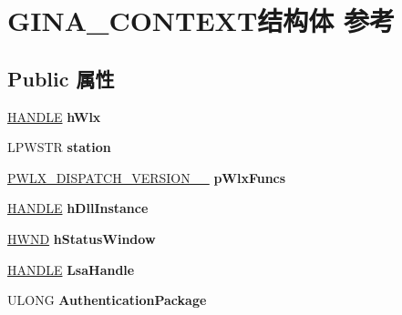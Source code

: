 \hypertarget{struct_g_i_n_a___c_o_n_t_e_x_t}{}\section{G\+I\+N\+A\+\_\+\+C\+O\+N\+T\+E\+X\+T结构体 参考}
\label{struct_g_i_n_a___c_o_n_t_e_x_t}
\subsection*{Public 属性}
\begin{DoxyCompactItemize}
\item 
\mbox{\label{struct_g_i_n_a___c_o_n_t_e_x_t_a8d3cb503eddfdc4de68cf738bfe8f876}} 
\hyperlink{interfacevoid}{H\+A\+N\+D\+LE} {\bfseries h\+Wlx}
\item 
\mbox{\label{struct_g_i_n_a___c_o_n_t_e_x_t_a18ffd634dbb32a40c13ec0a2cfe172a3}} 
L\+P\+W\+S\+TR {\bfseries station}
\item 
\mbox{\label{struct_g_i_n_a___c_o_n_t_e_x_t_ab94830523b274d730bfc6ade6144b2fe}} 
\hyperlink{struct___w_l_x___d_i_s_p_a_t_c_h___v_e_r_s_i_o_n__1__3}{P\+W\+L\+X\+\_\+\+D\+I\+S\+P\+A\+T\+C\+H\+\_\+\+V\+E\+R\+S\+I\+O\+N\+\_\+\_} {\bfseries p\+Wlx\+Funcs}
\item 
\mbox{\label{struct_g_i_n_a___c_o_n_t_e_x_t_a9a980fb43768f7759dcb4eaa1e26899a}} 
\hyperlink{interfacevoid}{H\+A\+N\+D\+LE} {\bfseries h\+Dll\+Instance}
\item 
\mbox{\label{struct_g_i_n_a___c_o_n_t_e_x_t_a75a34c7be58e9372b09af8b4dbe49360}} 
\hyperlink{interfacevoid}{H\+W\+ND} {\bfseries h\+Status\+Window}
\item 
\mbox{\label{struct_g_i_n_a___c_o_n_t_e_x_t_a0d8c54571b10bef142e3496ea21d2073}} 
\hyperlink{interfacevoid}{H\+A\+N\+D\+LE} {\bfseries Lsa\+Handle}
\item 
\mbox{\label{struct_g_i_n_a___c_o_n_t_e_x_t_a861816d7f2b446e9292f4cc6382c10a6}} 
U\+L\+O\+NG {\bfseries Authentication\+Package}

\end{DoxyCompactItemize}
